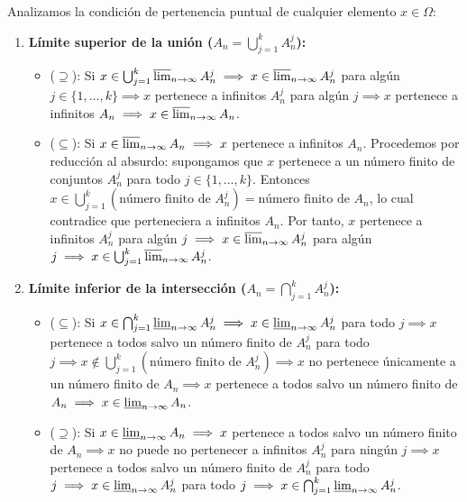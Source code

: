 \begin{demostracion}
Analizamos la condición de pertenencia puntual de cualquier elemento $x \in \Omega$:

\begin{enumerate}[label=\alph*)]
    \item \textbf{Límite superior de la unión ($A_n = \bigcup_{j=1}^k A_n^j$):}
    \begin{itemize}
        \item ($\supseteq$): Si $x \in \bigcup_{j=1}^k \varlimsup_{n \to \infty} A_n^j \implies x \in \varlimsup_{n \to \infty} A_n^j$ para algún $j \in \{1, \dots, k\} \implies x$ pertenece a infinitos $A_n^j$ para algún $j \implies x$ pertenece a infinitos $A_n \implies x \in \varlimsup_{n \to \infty} A_n$.

        \item ($\subseteq$): Si $x \in \varlimsup_{n \to \infty} A_n \implies x$ pertenece a infinitos $A_n$. Procedemos por reducción al absurdo: supongamos que $x$ pertenece a un número finito de conjuntos $A_n^j$ para todo $j \in \{1, \dots, k\}$. Entonces $x \in \bigcup_{j=1}^k (\text{número finito de } A_n^j) = \text{número finito de } A_n$, lo cual contradice que perteneciera a infinitos $A_n$. Por tanto, $x$ pertenece a infinitos $A_n^j$ para algún $j \implies x \in \varlimsup_{n \to \infty} A_n^j$ para algún $j \implies x \in \bigcup_{j=1}^k \varlimsup_{n \to \infty} A_n^j$.
    \end{itemize}

    \item \textbf{Límite inferior de la intersección ($A_n = \bigcap_{j=1}^k A_n^j$):}
    \begin{itemize}
        \item ($\subseteq$): Si $x \in \bigcap_{j=1}^k \varliminf_{n \to \infty} A_n^j \implies x \in \varliminf_{n \to \infty} A_n^j$ para todo $j \implies x$ pertenece a todos salvo un número finito de $A_n^j$ para todo $j \implies x \notin \bigcup_{j=1}^k (\text{número finito de } A_n^j) \implies x$ no pertenece únicamente a un número finito de $A_n \implies x$ pertenece a todos salvo un número finito de $A_n \implies x \in \varliminf_{n \to \infty} A_n$.

        \item ($\supseteq$): Si $x \in \varliminf_{n \to \infty} A_n \implies x$ pertenece a todos salvo un número finito de $A_n \implies x$ no puede no pertenecer a infinitos $A_n^j$ para ningún $j \implies x$ pertenece a todos salvo un número finito de $A_n^j$ para todo $j \implies x \in \varliminf_{n \to \infty} A_n^j$ para todo $j \implies x \in \bigcap_{j=1}^k \varliminf_{n \to \infty} A_n^j$.
    \end{itemize}
\end{enumerate}
\end{demostracion}

